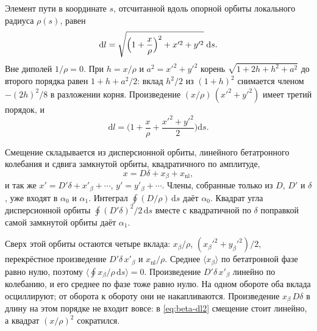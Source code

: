 Элемент пути в координате $s$, отсчитанной вдоль опорной орбиты локального радиуса $\rho(s)$, равен
\begin{equation}
\label{eq:beta-dl}
\mathrm{d}l
=\sqrt{\Bigl(1+\frac{x}{\rho}\Bigr)^2+x'^2+y'^2}\;\mathrm{d}s.
\end{equation}
Вне диполей $1/\rho=0$. При $h=x/\rho$ и $a^2=x'^2+y'^2$ корень $\sqrt{1+2h+h^2+a^2}$ до второго порядка равен $1+h+a^2/2$: вклад $h^2/2$ из $(1+h)^2$ снимается членом $-(2h)^2/8$ в разложении корня. Произведение $(x/\rho)\,(x'^2+y'^2)$ имеет третий порядок, и
\begin{equation}
\label{eq:beta-dl2}
\mathrm{d}l
=\Biggl(1+\frac{x}{\rho}+\frac{x'^2+y'^2}{2}\Biggr)\mathrm{d}s.
\end{equation}

Смещение складывается из дисперсионной орбиты, линейного бетатронного колебания и сдвига замкнутой орбиты, квадратичного по амплитуде,
\begin{equation}
\label{eq:beta-x}
x=D\delta+x_\beta+x_{\mathrm{nl}},
\end{equation}
и так же $x'=D'\delta+x'_\beta+\cdots$, $y'=y'_\beta+\cdots$. Члены, собранные только из $D$, $D'$ и $\delta$, уже входят в $\alpha_0$ и $\alpha_1$. Интеграл $\oint (D/\rho)\,\mathrm{d}s$ даёт $\alpha_0$. Квадрат угла дисперсионной орбиты $\oint(D'\delta)^2/2\,\mathrm{d}s$ вместе с квадратичной по $\delta$ поправкой самой замкнутой орбиты даёт $\alpha_1$.

Сверх этой орбиты остаются четыре вклада: $x_\beta/\rho$, $(x_\beta'^2+y_\beta'^2)/2$, перекрёстное произведение $D'\delta\,x'_\beta$ и $x_{\mathrm{nl}}/\rho$. Среднее $\langle x_\beta\rangle$ по бетатронной фазе равно нулю, поэтому $\langle\oint x_\beta/\rho\,\mathrm{d}s\rangle=0$. Произведение $D'\delta\,x'_\beta$ линейно по колебанию, и его среднее по фазе тоже равно нулю. На одном обороте оба вклада осциллируют; от оборота к обороту они не накапливаются. Произведение $x_\beta\,D\delta$ в длину на этом порядке не входит вовсе: в \eqref{eq:beta-dl2} смещение стоит линейно, а квадрат $(x/\rho)^2$ сократился.


